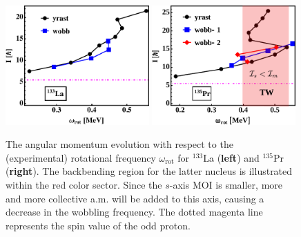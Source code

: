 \begin{figure}
    \begin{center}
        \includegraphics[width=0.49\textwidth]{Chapters/Figures/133La_wob.pdf}
        \includegraphics[width=0.49\textwidth]{Chapters/Figures/135Pd_wob_edited.pdf}
        \caption{The angular momentum evolution with respect to the (experimental) rotational frequency $\omega_\text{rot}$ for $^{133}$La (\textbf{left}) and $^{135}$Pr (\textbf{right}). The backbending region for the latter nucleus is illustrated within the red color sector. Since the $s$-axis MOI is smaller, more and more collective a.m. will be added to this axis, causing a decrease in the wobbling frequency. The dotted magenta line represents the spin value of the odd proton.}
        \label{spin-vs-rotationalFreq-133-135}
    \end{center}
\end{figure}